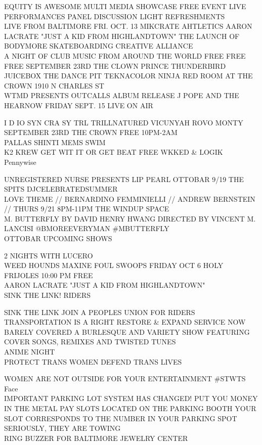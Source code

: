 \documentclass[10pt,letterpaper]{article}
\begin{document}
EQUITY IS AWESOME MULTI MEDIA SHOWCASE FREE EVENT LIVE PERFORMANCES PANEL DISCUSSION LIGHT REFRESHMENTS\\
LIVE FROM BALTIMORE FRI. OCT. 13 MIKCRATE AHTLETICS AARON LACRATE "JUST A KID FROM HIGHLANDTOWN" THE LAUNCH OF BODYMORE SKATEBOARDING CREATIVE ALLIANCE\\
A NIGHT OF CLUB MUSIC FROM AROUND THE WORLD FREE FREE FREE SEPTEMBER 23RD THE CLOWN PRINCE THUNDERBIRD JUICEBOX THE DANCE PIT TEKNACOLOR NINJA RED ROOM AT THE CROWN 1910 N CHARLES ST\\
WTMD PRESENTS OUTCALLS ALBUM RELEASE J POPE AND THE HEARNOW FRIDAY SEPT. 15 LIVE ON AIR

I D IO SYN CRA SY TRL TRILLNATURED VICUNYAH ROVO MONTY SEPTEMBER 23RD THE CROWN FREE 10PM{-}2AM\\
PALLAS SHINTI MEMS SWIM\\
K2 KREW GET WIT IT OR GET BEAT FREE WKKED \& LOGIK\\
Pennywise

UNREGISTERED NURSE PRESENTS LIP PEARL OTTOBAR 9/19 THE SPITS DJCELEBRATEDSUMMER\\
LOVE THEME // BERNARDINO FEMMINIELLI // ANDREW BERNSTEIN // THURS 9/21 8PM{-}11PM THE WINDUP SPACE\\
M. BUTTERFLY BY DAVID HENRY HWANG DIRECTED BY VINCENT M. LANCISI @BMOREEVERYMAN \#MBUTTERFLY\\
OTTOBAR UPCOMING SHOWS

2 NIGHTS WITH LUCERO\\
WEED HOUNDS MAXINE FOUL SWOOPS FRIDAY OCT 6 HOLY FRIJOLES 10:00 PM FREE\\
AARON LACRATE "JUST A KID FROM HIGHLANDTOWN"\\
SINK THE LINK!  RIDERS

SINK THE LINK JOIN A PEOPLES UNION FOR RIDERS TRANSPORTATION IS A RIGHT RESTORE \& EXPAND SERVICE NOW\\
BARELY COVERED A BURLESQUE AND VARIETY SHOW FEATURING COVER SONGS, REMIXES AND TWISTED TUNES\\
ANIME NIGHT\\
PROTECT TRANS WOMEN DEFEND TRANS LIVES

WOMEN ARE NOT OUTSIDE FOR YOUR ENTERTAINMENT \#STWTS\\
Face\\
IMPORTANT PARKING LOT SYSTEM HAS CHANGED!  PUT YOU MONEY IN THE METAL PAY SLOTS LOCATED ON THE PARKING BOOTH YOUR SLOT CORRESPONDS TO THE NUMBER IN YOUR PARKING SPOT SERIOUSLY, THEY ARE TOWING\\
RING BUZZER FOR BALTIMORE JEWELRY CENTER
\end{document}
